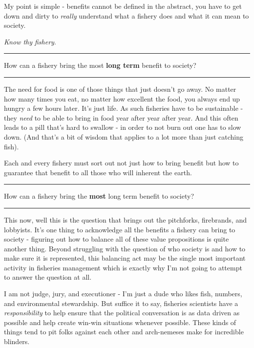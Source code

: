 \documentclass[11pt,a5paper]{book}
\begin{document}
My point is simple - benefits cannot be defined in the abstract, you have to get down and dirty to \textit{really} understand what a fishery does and what it can mean to society. 
\newline

\textit{Know thy fishery}.
\newpage


\noindent \rule{\textwidth}{0.5pt} 
\noindent How can a fishery bring the most \textbf{long term} benefit to society?
\newline
\rule{\textwidth}{0.5pt} 
\vspace{5pt}

The need for food is one of those things that just doesn't go away. No matter how many times you eat, no matter how excellent the food, you always end up hungry a few hours later. It's just life. As such fisheries have to be sustainable - they \textit{need} to be able to bring in food year after year after year. And this often leads to a pill that's hard to swallow - in order to not burn out one has to slow down. (And that's a bit of wisdom that applies to a lot more than just catching fish). \newline

Each and every fishery must sort out not just how to bring benefit but how to guarantee that benefit to all those who will inherent the earth.
\newpage


\noindent \rule{\textwidth}{0.5pt} 
\noindent How can a fishery bring the \textbf{most} long term benefit to society?
\newline
\rule{\textwidth}{0.5pt} 
\vspace{5pt}

This now, well this is the question that brings out the pitchforks, firebrands, and lobbyists. It's one thing to acknowledge all the benefits a fishery can bring to society - figuring out how to balance all of these value propositions is quite another thing. Beyond struggling with the question of who society is and how to make sure it is represented, this balancing act may be the single most important activity in fisheries management which is exactly why I'm not going to attempt to answer the question at all. 
\newline

I am not judge, jury, and executioner - I'm just a dude who likes fish, numbers, and environmental stewardship. But suffice it to say, fisheries scientists have a \textit{responsibility} to help ensure that the political conversation is as data driven as possible and help create win-win situations whenever possible. These kinds of things tend to pit folks against each other and arch-nemeses make for incredible blinders.
\newline
\end{document}
